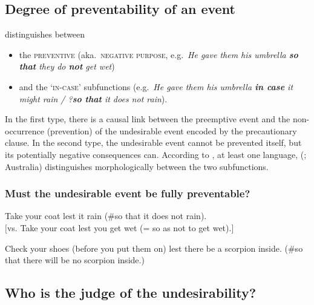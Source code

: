 \documentclass[output=paper,colorlinks,citecolor=brown]{langscibook}
\begin{document}
\subsection{Degree of preventability of an event}
\label{subsec:prepreventability}

\citet[298]{lichtenberk1995} distinguishes between

\begin{itemize}
    \item the \textsc{preventive} (aka.\  \textsc{negative purpose}, e.g.\ \textit{He gave them his umbrella \textbf{so that} they do \textbf{not} get wet})
    \item and the `\textsc{in-case}' subfunctions (e.g.\ \textit{He gave them his umbrella \textbf{in case} it might rain \textnormal{/} ?\textbf{so that} it does not rain}).
\end{itemize}

\noindent In the first type, there is a causal link between the preemptive event and the non-occurrence (prevention) of the undesirable event encoded by the precautionary clause. In the second type, the undesirable event cannot be prevented itself, but its potentially negative consequences can. According to \citet[308]{lichtenberk1995}, at least one language,  (; Australia) distinguishes morphologically between the two subfunctions.

\subsubsection{Must the undesirable event be fully preventable?}
\label{2.2.1}

\label{2.2.1.1}

\ea \label{p49} Take your coat lest it rain (\#so that it does not rain). \\
$[$\textnormal{vs.} Take your coat lest you get wet (= so as not to get wet).$]$
\z

\ea \label{p50} Check your shoes (before you put them on) lest there be a scorpion inside. (\#so that there will be no scorpion inside.)
\z



\subsection{Who is the judge of the undesirability?}
\label{subsec:prejudge}
\end{document}

